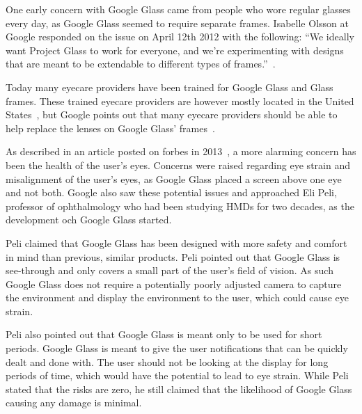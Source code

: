 One early concern with Google Glass came from people who wore regular glasses every day, as Google Glass seemed to require separate frames. Isabelle Olsson at Google responded on the issue on April 12th 2012 with the following: ``We ideally want Project Glass to work for everyone, and we're experimenting with designs that are meant to be extendable to different types of frames.''~\cite{GoogleGlassFrameResponse}.

Today many eyecare providers have been trained for Google Glass and Glass frames. These trained eyecare providers are however mostly located in the United States~\cite{frameProviders}, but Google points out that many eyecare providers should be able to help replace the lenses on Google Glass' frames~\cite{framesGlass}.

As described in an article posted on forbes in 2013~\cite{ackerman13}, a more alarming concern has been the health of the user's eyes. Concerns were raised regarding eye strain and misalignment of the user's eyes, as Google Glass placed a screen above one eye and not both. Google also saw these potential issues and approached Eli Peli, professor of ophthalmology who had been studying HMDs for two decades, as the development och Google Glass started.

Peli claimed that Google Glass has been designed with more safety and comfort in mind than previous, similar products. Peli pointed out that Google Glass is see-through and only covers a small part of the user's field of vision. As such Google Glass does not require a potentially poorly adjusted camera to capture the environment and display the environment to the user, which could cause eye strain.

Peli also pointed out that Google Glass is meant only to be used for short periods. Google Glass is meant to give the user notifications that can be quickly dealt and done with. The user should not be looking at the display for long periods of time, which would have the potential to lead to eye strain. While Peli stated that the risks are zero, he still claimed that the likelihood of Google Glass causing any damage is minimal.

